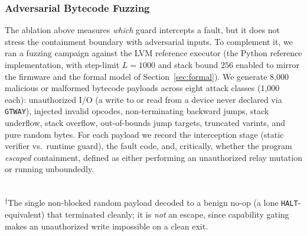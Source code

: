 \documentclass[a4paper,fleqn,longmktitle]{cas-dc}
\begin{document}
\subsubsection{Adversarial Bytecode Fuzzing}
\label{sec:res_fuzzing}

The ablation above measures \emph{which} guard intercepts a fault, but it does not stress the containment boundary with adversarial inputs. To complement it, we ran a fuzzing campaign against the LVM reference executor (the Python reference implementation, with step-limit $L{=}1000$ and stack bound $256$ enabled to mirror the firmware and the formal model of Section~\ref{sec:formal}). We generate 8{,}000 malicious or malformed bytecode payloads across eight attack classes (1{,}000 each): unauthorized I/O (a write to or read from a device never declared via \texttt{GTWAY}), injected invalid opcodes, non-terminating backward jumps, stack underflow, stack overflow, out-of-bounds jump targets, truncated varints, and pure random bytes. For each payload we record the interception stage (static verifier vs.\ runtime guard), the fault code, and, critically, whether the program \emph{escaped} containment, defined as either performing an unauthorized relay mutation or running unboundedly.

\begin{table}[t]
\centering
\caption{Adversarial fuzzing containment (8{,}000 payloads, seed=42, $L{=}1000$, stack bound 256). ``Escaped'' = unauthorized side effect or unbounded run.}
\label{tab:fuzzing}
\footnotesize
{}\\[2pt]
{\footnotesize \textsuperscript{$\dagger$}The single non-blocked random payload decoded to a benign no-op (a lone \texttt{HALT}-equivalent) that terminated cleanly; it is \emph{not} an escape, since capability gating makes an unauthorized write impossible on a clean exit.}
\end{table}
\end{document}

